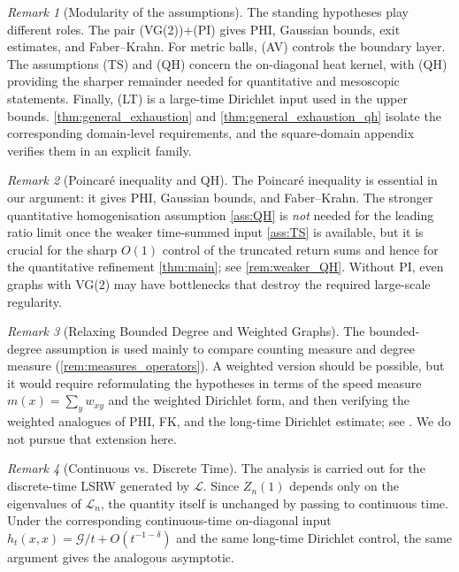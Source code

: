 \documentclass[reqno]{amsart}
\numberwithin{equation}{section}
\theoremstyle{definition}
\theoremstyle{remark}
\newtheorem{remark}[remark]{Remark}
\newcommand{\Cref}[1]{\autoref{#1}}
\newcommand{\cG}{\mathcal{G}}
\newcommand{\LL}{\mathcal{L}}
\begin{document}
\begin{remark}[Modularity of the assumptions]\label{rem:modular_assumptions}
The standing hypotheses play different roles. The pair \textup{(VG(2))}+\textup{(PI)} gives PHI, Gaussian bounds, exit estimates, and Faber--Krahn. For metric balls, \textup{(AV)} controls the boundary layer. The assumptions \textup{(TS)} and \textup{(QH)} concern the on-diagonal heat kernel, with \textup{(QH)} providing the sharper remainder needed for quantitative and mesoscopic statements. Finally, \textup{(LT)} is a large-time Dirichlet input used in the upper bounds. \Cref{thm:general_exhaustion} and \Cref{thm:general_exhaustion_qh} isolate the corresponding domain-level requirements, and the square-domain appendix verifies them in an explicit family.
\end{remark}

\begin{remark}[Poincar\'e inequality and QH]
The Poincaré inequality is essential in our argument: it gives PHI, Gaussian bounds, and Faber--Krahn. The stronger quantitative homogenisation assumption \Cref{ass:QH} is \emph{not} needed for the leading ratio limit once the weaker time-summed input \Cref{ass:TS} is available, but it is crucial for the sharp $O(1)$ control of the truncated return sums and hence for the quantitative refinement \Cref{thm:main}; see \Cref{rem:weaker_QH}. Without PI, even graphs with VG(2) may have bottlenecks that destroy the required large-scale regularity.
\end{remark}


\begin{remark}[Relaxing Bounded Degree and Weighted Graphs]\label{rem:weighted}
The bounded-degree assumption is used mainly to compare counting measure and degree measure (\Cref{rem:measures_operators}). A weighted version should be possible, but it would require reformulating the hypotheses in terms of the speed measure $m(x)=\sum_y w_{xy}$ and the weighted Dirichlet form, and then verifying the weighted analogues of PHI, FK, and the long-time Dirichlet estimate; see \cite{Delmotte99}. We do not pursue that extension here.
\end{remark}


\begin{remark}[Continuous vs. Discrete Time]\label{rem:continuous_time}
The analysis is carried out for the discrete-time LSRW generated by $\LL$. Since $Z_n(1)$ depends only on the eigenvalues of $\LL_n$, the quantity itself is unchanged by passing to continuous time. Under the corresponding continuous-time on-diagonal input $h_t(x,x)=\cG/t+O(t^{-1-\delta})$ and the same long-time Dirichlet control, the same argument gives the analogous asymptotic.
\end{remark}
\end{document}
